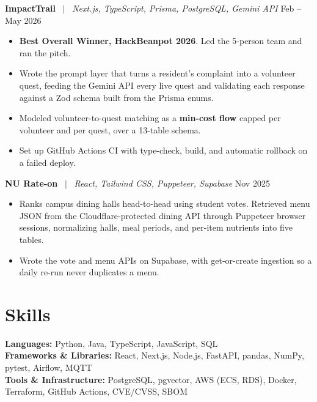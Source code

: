 \documentclass[letterpaper,10pt]{article}
\newcommand{\entrysize}{\fontsize{10.5}{12}\selectfont}
\newif\ifentrygap
\newcommand{\entrygapsize}{6.4pt}
\newcommand{\entryfirstgap}{0.4pt}
\newcommand{\entrysep}{\ifentrygap\vspace{\entrygapsize}\else\vspace{\entryfirstgap}\fi\global\entrygaptrue}
\let\entryorigsection\section
\renewcommand{\section}{\global\entrygapfalse\entryorigsection}
\newcommand{\project}[3]{\entrysep{\entrysize\textbf{#1}} \ $\vert$ \ \textit{#2} \hfill #3}
\begin{document}
\project{ImpactTrail}{Next.js, TypeScript, Prisma, PostgreSQL, Gemini API}{Feb -- May 2026}
\begin{itemize}
  \item \textbf{Best Overall Winner, HackBeanpot 2026}. Led the 5-person team and ran the pitch.
  \item Wrote the prompt layer that turns a resident's complaint into a volunteer quest, feeding the Gemini API every live
        quest and validating each response against a Zod schema built from the Prisma enums.
  \item Modeled volunteer-to-quest matching as a \textbf{min-cost flow} capped per volunteer and per quest, over a 13-table schema.
  \item Set up GitHub Actions CI with type-check, build, and automatic rollback on a failed deploy.
\end{itemize}

\project{NU Rate-on}{React, Tailwind CSS, Puppeteer, Supabase}{Nov 2025}
\begin{itemize}
  \item Ranks campus dining halls head-to-head using student votes. Retrieved menu JSON from the Cloudflare-protected dining
        API through Puppeteer browser sessions, normalizing halls, meal periods, and per-item nutrients into five tables.
  \item Wrote the vote and menu APIs on Supabase, with get-or-create ingestion so a daily re-run never duplicates a menu.
\end{itemize}

\section{Skills}

\textbf{Languages:} Python, Java, TypeScript, JavaScript, SQL \\
\textbf{Frameworks \& Libraries:} React, Next.js, Node.js, FastAPI, pandas, NumPy, pytest, Airflow, MQTT \\
\textbf{Tools \& Infrastructure:} PostgreSQL, pgvector, AWS (ECS, RDS), Docker, Terraform, GitHub Actions, CVE/CVSS, SBOM
\end{document}
